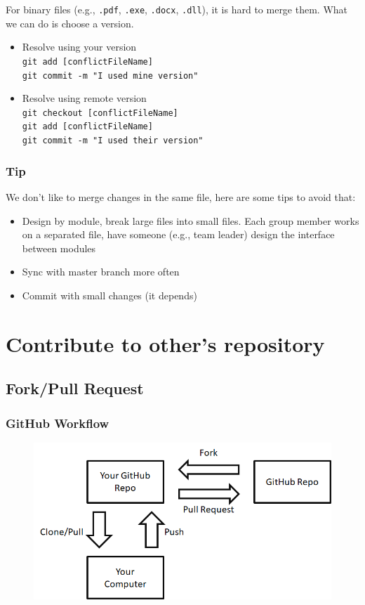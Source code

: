 \documentclass{beamer}
\begin{document}
			\begin{frame}
				For binary files (e.g., \texttt{.pdf}, \texttt{.exe}, \texttt{.docx}, \texttt{.dll}), it is hard to merge them. What we can do is choose a version.
				\begin{itemize}
					\item Resolve using your version\\
						\texttt{git add [conflictFileName]}\\
						\texttt{git commit -m "I used mine version"}
					\item Resolve using remote version\\
						\texttt{git checkout [conflictFileName]}\\
						\texttt{git add [conflictFileName]}\\
						\texttt{git commit -m "I used their version"}
				\end{itemize}
			\end{frame}

			\begin{frame}
				\frametitle{Tip}
				We don't like to merge changes in the same file, here are some tips to avoid that:
				\begin{itemize}
					\item Design by module, break large files into small files. Each group member works on a separated file, have someone (e.g., team leader) design the interface between modules
					\item Sync with master branch more often
					\item Commit with small changes (it depends)
				\end{itemize}
			\end{frame}

	\section{Contribute to other's repository}
		\subsection{Fork/Pull Request}
			\begin{frame}
				\frametitle{GitHub Workflow}
				\begin{figure}[!h]
					\centering
					\includegraphics[width=\textwidth]{github-workflow}
				\end{figure}
			\end{frame}
\end{document}
